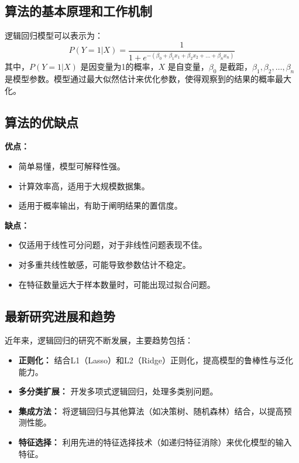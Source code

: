\subsection*{算法的基本原理和工作机制}
逻辑回归模型可以表示为：
\[
    P(Y=1|X) = \frac{1}{1 + e^{-(\beta_0 + \beta_1 x_1 + \beta_2 x_2 + \ldots + \beta_n x_n)}}
\]
其中，\(P(Y=1|X)\) 是因变量为1的概率，\(X\) 是自变量，\(\beta_0\) 是截距，\(\beta_1, \beta_2, \ldots, \beta_n\) 是模型参数。模型通过最大似然估计来优化参数，使得观察到的结果的概率最大化。

\subsection*{算法的优缺点}
\textbf{优点：}
\begin{itemize}
    \item 简单易懂，模型可解释性强。
    \item 计算效率高，适用于大规模数据集。
    \item 适用于概率输出，有助于阐明结果的置信度。
\end{itemize}

\textbf{缺点：}
\begin{itemize}
    \item 仅适用于线性可分问题，对于非线性问题表现不佳。
    \item 对多重共线性敏感，可能导致参数估计不稳定。
    \item 在特征数量远大于样本数量时，可能出现过拟合问题。
\end{itemize}

\subsection*{最新研究进展和趋势}
近年来，逻辑回归的研究不断发展，主要趋势包括：
\begin{itemize}
    \item \textbf{正则化：} 结合L1（Lasso）和L2（Ridge）正则化，提高模型的鲁棒性与泛化能力。
    \item \textbf{多分类扩展：} 开发多项式逻辑回归，处理多类别问题。
    \item \textbf{集成方法：} 将逻辑回归与其他算法（如决策树、随机森林）结合，以提高预测性能。
    \item \textbf{特征选择：} 利用先进的特征选择技术（如递归特征消除）来优化模型的输入特征。
\end{itemize}

